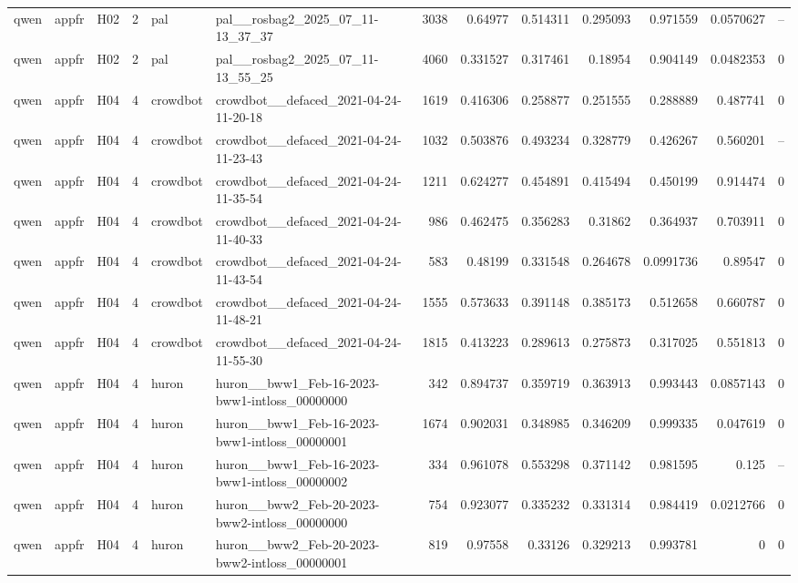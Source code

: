 \begin{longtable}{lllrllrrrrrrr}
qwen & appfr & H02 & 2 & pal & pal\_\_rosbag2\_2025\_07\_11-13\_37\_37 & 3038 & 0.64977 & 0.514311 & 0.295093 & 0.971559 & 0.0570627 & -- \\
qwen & appfr & H02 & 2 & pal & pal\_\_rosbag2\_2025\_07\_11-13\_55\_25 & 4060 & 0.331527 & 0.317461 & 0.18954 & 0.904149 & 0.0482353 & 0 \\
qwen & appfr & H04 & 4 & crowdbot & crowdbot\_\_defaced\_2021-04-24-11-20-18 & 1619 & 0.416306 & 0.258877 & 0.251555 & 0.288889 & 0.487741 & 0 \\
qwen & appfr & H04 & 4 & crowdbot & crowdbot\_\_defaced\_2021-04-24-11-23-43 & 1032 & 0.503876 & 0.493234 & 0.328779 & 0.426267 & 0.560201 & -- \\
qwen & appfr & H04 & 4 & crowdbot & crowdbot\_\_defaced\_2021-04-24-11-35-54 & 1211 & 0.624277 & 0.454891 & 0.415494 & 0.450199 & 0.914474 & 0 \\
qwen & appfr & H04 & 4 & crowdbot & crowdbot\_\_defaced\_2021-04-24-11-40-33 & 986 & 0.462475 & 0.356283 & 0.31862 & 0.364937 & 0.703911 & 0 \\
qwen & appfr & H04 & 4 & crowdbot & crowdbot\_\_defaced\_2021-04-24-11-43-54 & 583 & 0.48199 & 0.331548 & 0.264678 & 0.0991736 & 0.89547 & 0 \\
qwen & appfr & H04 & 4 & crowdbot & crowdbot\_\_defaced\_2021-04-24-11-48-21 & 1555 & 0.573633 & 0.391148 & 0.385173 & 0.512658 & 0.660787 & 0 \\
qwen & appfr & H04 & 4 & crowdbot & crowdbot\_\_defaced\_2021-04-24-11-55-30 & 1815 & 0.413223 & 0.289613 & 0.275873 & 0.317025 & 0.551813 & 0 \\
qwen & appfr & H04 & 4 & huron & huron\_\_bww1\_Feb-16-2023-bww1-intloss\_00000000 & 342 & 0.894737 & 0.359719 & 0.363913 & 0.993443 & 0.0857143 & 0 \\
qwen & appfr & H04 & 4 & huron & huron\_\_bww1\_Feb-16-2023-bww1-intloss\_00000001 & 1674 & 0.902031 & 0.348985 & 0.346209 & 0.999335 & 0.047619 & 0 \\
qwen & appfr & H04 & 4 & huron & huron\_\_bww1\_Feb-16-2023-bww1-intloss\_00000002 & 334 & 0.961078 & 0.553298 & 0.371142 & 0.981595 & 0.125 & -- \\
qwen & appfr & H04 & 4 & huron & huron\_\_bww2\_Feb-20-2023-bww2-intloss\_00000000 & 754 & 0.923077 & 0.335232 & 0.331314 & 0.984419 & 0.0212766 & 0 \\
qwen & appfr & H04 & 4 & huron & huron\_\_bww2\_Feb-20-2023-bww2-intloss\_00000001 & 819 & 0.97558 & 0.33126 & 0.329213 & 0.993781 & 0 & 0 \\

\end{longtable}
